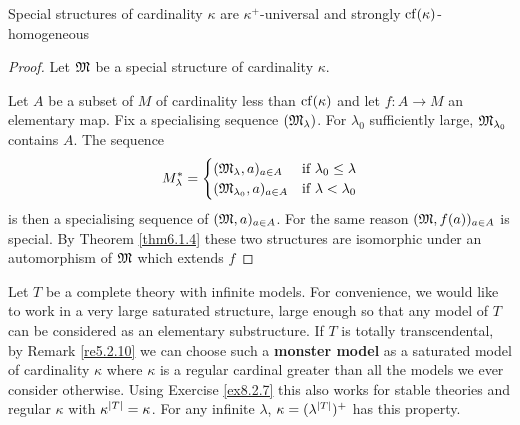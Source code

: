 \documentclass[11pt]{article}
\begin{document}
\begin{theorem}[]
Special structures of cardinality \(\kappa\) are \(\kappa^+\)-universal and strongly \(\operatorname{cf}(\kappa)\)-homogeneous
\end{theorem}

\begin{proof}
Let \(\mathfrak{M}\) be a special structure of cardinality \(\kappa\).


Let \(A\) be a subset of \(M\) of cardinality less than \(\operatorname{cf}(\kappa)\) and let \(f:A\to M\) an
elementary map. Fix a specialising sequence \((\mathfrak{M}_\lambda)\). For \(\lambda_0\) sufficiently
large, \(\mathfrak{M}_{\lambda_0}\) contains \(A\). The sequence
\begin{equation*}
M_\lambda^*=
\begin{cases}
(\mathfrak{M}_\lambda,a)_{a\in A}&\text{if }\lambda_0\le\lambda\\
(\mathfrak{M}_{\lambda_0},a)_{a\in A}&\text{if }\lambda<\lambda_0
\end{cases}
\end{equation*}
is then a specialising sequence of \((\mathfrak{M},a)_{a\in A}\). For the same reason \((\mathfrak{M},f(a))_{a\in A}\) is
special. By Theorem \ref{thm6.1.4} these two structures are isomorphic under an automorphism
of \(\mathfrak{M}\) which extends \(f\)
\end{proof}

Let \(T\) be a complete theory with infinite models. For convenience, we would like to work in a
very large saturated structure, large enough so that any model of \(T\) can be considered as an
elementary substructure. If \(T\) is totally transcendental, by Remark \ref{re5.2.10} we can
choose such a \textbf{monster model} as a saturated model of cardinality \(\kappa\) where \(\kappa\) is a regular cardinal
greater than all the models we ever consider otherwise. Using Exercise \ref{ex8.2.7} this also
works for stable theories and regular \(\kappa\) with \(\kappa^{\abs{T}}=\kappa\). For any infinite
\(\lambda\), \(\kappa=(\lambda^{\abs{T}})^+\) has this property.
\end{document}
